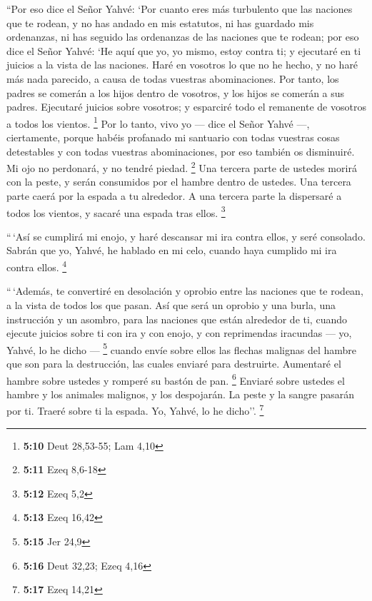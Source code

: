 \begin{paracol}{2}
 ``Por eso dice el Señor Yahvé: `Por cuanto eres más
turbulento que las naciones que te rodean, y no has andado en mis
estatutos, ni has guardado mis ordenanzas, ni has seguido las ordenanzas
de las naciones que te rodean;  por eso dice el Señor
Yahvé: `He aquí que yo, yo mismo, estoy contra ti; y ejecutaré en ti
juicios a la vista de las naciones.  Haré en vosotros lo
que no he hecho, y no haré más nada parecido, a causa de todas vuestras
abominaciones.  Por tanto, los padres se comerán a los
hijos dentro de vosotros, y los hijos se comerán a sus padres. Ejecutaré
juicios sobre vosotros; y esparciré todo el remanente de vosotros a
todos los vientos. \footnote{\textbf{5:10} Deut 28,53-55; Lam 4,10}
 Por lo tanto, vivo yo --- dice el Señor Yahvé ---,
ciertamente, porque habéis profanado mi santuario con todas vuestras
cosas detestables y con todas vuestras abominaciones, por eso también os
disminuiré. Mi ojo no perdonará, y no tendré piedad. \footnote{\textbf{5:11}
  Ezeq 8,6-18}  Una tercera parte de ustedes morirá con
la peste, y serán consumidos por el hambre dentro de ustedes. Una
tercera parte caerá por la espada a tu alrededor. A una tercera parte la
dispersaré a todos los vientos, y sacaré una espada tras ellos.
\footnote{\textbf{5:12} Ezeq 5,2}

 ``\,`Así se cumplirá mi enojo, y haré descansar mi ira
contra ellos, y seré consolado. Sabrán que yo, Yahvé, he hablado en mi
celo, cuando haya cumplido mi ira contra ellos. \footnote{\textbf{5:13}
  Ezeq 16,42}

 ``\,`Además, te convertiré en desolación y oprobio entre
las naciones que te rodean, a la vista de todos los que pasan.
 Así que será un oprobio y una burla, una instrucción y
un asombro, para las naciones que están alrededor de ti, cuando ejecute
juicios sobre ti con ira y con enojo, y con reprimendas iracundas ---
yo, Yahvé, lo he dicho --- \footnote{\textbf{5:15} Jer 24,9}
 cuando envíe sobre ellos las flechas malignas del hambre
que son para la destrucción, las cuales enviaré para destruirte.
Aumentaré el hambre sobre ustedes y romperé su bastón de pan.
\footnote{\textbf{5:16} Deut 32,23; Ezeq 4,16}  Enviaré
sobre ustedes el hambre y los animales malignos, y los despojarán. La
peste y la sangre pasarán por ti. Traeré sobre ti la espada. Yo, Yahvé,
lo he dicho''. \footnote{\textbf{5:17} Ezeq 14,21}

\switchcolumn
\begin{otherlanguage}{english}


\end{otherlanguage}
\end{paracol}
